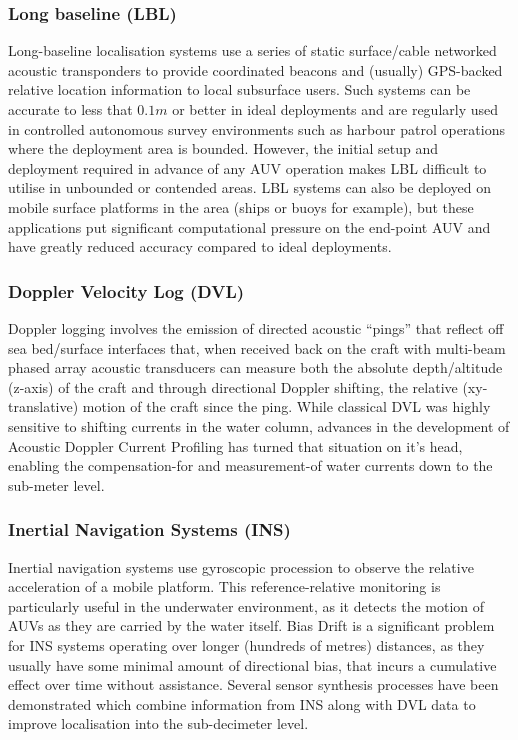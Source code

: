 \documentclass[conference]{IEEEtran}
\begin{document}
\subsubsection{Long baseline (LBL)}
Long-baseline localisation systems use a series of static surface/cable networked acoustic transponders to provide coordinated beacons and (usually) GPS-backed relative location information to local subsurface users. 
Such systems can be accurate to less that $0.1m$ or better in ideal deployments and are regularly used in controlled autonomous survey environments such as harbour patrol operations where the deployment area is bounded. 
However, the initial setup and deployment required in advance of any AUV operation makes LBL difficult to utilise in unbounded or contended areas.
LBL systems can also be deployed on mobile surface platforms in the area (ships or buoys for example), but these applications put significant computational pressure on the end-point AUV and have greatly reduced accuracy compared to ideal deployments\cite{Matos1999}.
\subsubsection{Doppler Velocity Log (DVL)}
Doppler logging involves the emission of directed acoustic ``pings'' that reflect off sea bed/surface interfaces that, when received back on the craft with multi-beam phased array acoustic transducers can measure both the absolute depth/altitude (z-axis) of the craft and through directional Doppler shifting, the relative (xy-translative) motion of the craft since the ping.
While classical DVL was highly sensitive to shifting currents in the water column, advances in the development of Acoustic Doppler Current Profiling has turned that situation on it's head, enabling the compensation-for and measurement-of water currents down to the sub-meter level\cite{Snyder2010}.
\subsubsection{Inertial Navigation Systems (INS)}
Inertial navigation systems use gyroscopic procession to observe the relative acceleration of a mobile platform.
This reference-relative monitoring is particularly useful in the underwater environment, as it detects the motion of AUVs as they are carried by the water itself.
Bias Drift is a significant problem for INS systems operating over longer (hundreds of metres) distances, as they usually have some minimal amount of directional bias, that incurs a cumulative effect over time without assistance.
Several sensor synthesis processes have been demonstrated which combine information from INS along with DVL data to improve localisation into the sub-decimeter level\cite{Jalving2003}\cite{Liu2014}.
\end{document}
